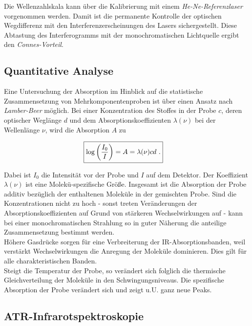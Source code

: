 \documentclass[numbers=noenddot,a4paper,10pt,twocolumn]{article}
\newcommand{\ix}[1]{_\text{#1}}
\newcommand{\tilt}[1]{\textit{#1}}
\begin{document}
		Die Wellenzahlskala kann \"uber die Kalibrierung mit einem \tilt{He-Ne-Referenzlaser} vorgenommen werden. Damit ist die permanente Kontrolle der optischen Wegdifferenz mit den Interferenzerscheinungen des Lasers sichergestellt. Diese Abtastung des Interferogramms mit der monochromatischen Lichtquelle ergibt den \tilt{Connes-Vorteil}.
		
		\subsection{Quantitative Analyse}
		
		Eine Untersuchung der Absorption im Hinblick auf die statistische Zusammensetzung von Mehrkomponentenproben ist \"uber einen Ansatz nach \tilt{Lamber-Beer} m\"oglich. Bei einer Konzentration des Stoffes in der Probe $c$, deren optischer Wegl\"ange $d$ und dem Absorptionskoeffizienten $\lambda(\nu)$ bei der Wellenl\"ange $\nu$, wird die Absorption $A$ zu
		
		\begin{align}
		\Aboxed{
			\log\left(\frac{I\ix{0}}{I}\right)=A=\lambda(\nu)cd\,\, .
		}
		\label{eq:lamber}
		\end{align}
		
		
		Dabei ist $I\ix{0}$ die Intensit\"at vor der Probe und $I$ auf dem Detektor. Der Koeffizient $\lambda(\nu)$ ist eine Molek\"u-spezifische Gr\"o{\ss}e. Insgesamt ist die Absorption der Probe additiv bez\"uglich der enthaltenen Molek\"ule in der gemischten Probe. Sind die Konzentrationen nicht zu hoch - sonst treten Ver\"anderungen der Absorptionskoeffizienten auf Grund von st\"arkeren Wechselwirkungen auf - kann bei einer monochromatischen Strahlung so in guter N\"aherung die anteilige Zusammensetzung bestimmt werden.\\
		H\"ohere Gasdr\"ucke sorgen f\"ur eine Verbreiterung der IR-Absorptionsbanden, weil verst\"arkt Wechselwirkungen die Anregung der Molek\"ule dominieren. Dies gilt f\"ur alle charakteristischen Banden.\\
		Steigt die Temperatur der Probe, so ver\"andert sich folglich die thermische Gleichverteilung der Molek\"ule in den Schwingungsniveaus. Die spezifische Absorption der Probe ver\"andert sich und zeigt u.U. ganz neue Peaks. 
		
	\subsection{ATR-Infrarotspektroskopie}
		
\end{document}
